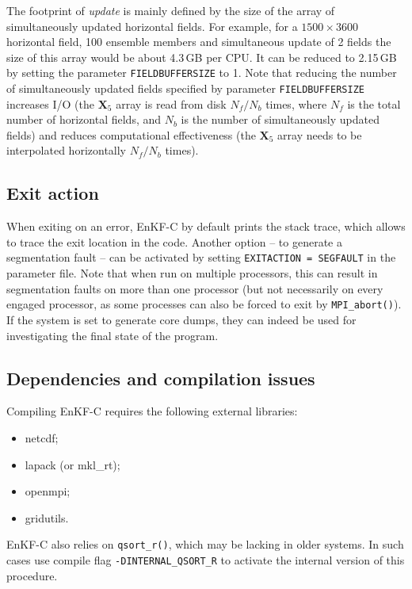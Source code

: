 \documentclass[11pt]{report}
\newcommand{\mb} {\mathbf}
\begin{document}
The footprint of \emph{update} is mainly defined by the size of the array of simultaneously updated horizontal fields.
For example, for a $1500 \times 3600$ horizontal field, 100 ensemble members and simultaneous update of 2 fields the size of this array would be about 4.3\,GB per CPU.
It can be reduced to 2.15\,GB by setting the parameter \verb|FIELDBUFFERSIZE| to 1.
Note that reducing the number of simultaneously updated fields specified by parameter \verb|FIELDBUFFERSIZE| increases I/O (the $\mb X_5$ array is read from disk $N_f / N_b$ times, where $N_f$ is the total number of horizontal fields, and $N_b$ is the number of simultaneously updated fields) and reduces computational effectiveness (the $\mb X_5$ array needs to be interpolated horizontally $N_f / N_b$ times).

\subsection{Exit action}

When exiting on an error, EnKF-C by default prints the stack trace, which allows to trace the exit location in the code.
Another option -- to generate a segmentation fault -- can be activated by setting \verb|EXITACTION = SEGFAULT| in the parameter file.
Note that when run on multiple processors, this can result in segmentation faults on more than one processor (but not necessarily on every engaged processor, as some processes can also be forced to exit by \verb|MPI_abort()|).
If the system is set to generate core dumps, they can indeed be used for investigating the final state of the program.

\subsection{Dependencies and compilation issues}

Compiling EnKF-C requires the following external libraries:
\begin{itemize}
\item netcdf;
\item lapack (or mkl\_rt);
\item openmpi;
\item gridutils.
\end{itemize}

EnKF-C also relies on \verb|qsort_r()|, which may be lacking in older systems.
In such cases use compile flag \verb|-DINTERNAL_QSORT_R| to activate the internal version of this procedure.
\end{document}
